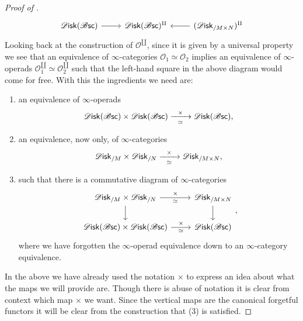 \documentclass[../text.tex]{subfiles}
\begin{document}
\begin{proof}[Proof of ]
\begin{equation}
\begin{tikzcd}
            \disk(\bsc) \arrow[r] & \disk(\bsc)^{\amalg} & (\disk_{/M \times N})^{\amalg} \arrow[l]
        \end{tikzcd}
    \end{equation}
    Looking back at the construction \cite[Con.2.4.3.1]{lurie_ha} of $\mathscr{O}^{\coprod}$, since it is given by a universal property we see that an equivalence of $\infty$-categories $\mathscr{O}_1 \simeq \mathscr{O}_2$ implies an equivalence of $\infty$-operads $\mathscr{O}_1^{\amalg} \simeq \mathscr{O}_2^{\amalg}$ such that the left-hand square in the above diagram would come for free. With this the ingredients we need are:
    \begin{enumerate}
        \item an equivalence of $\infty$-operads
        \begin{equation}
            \disk(\bsc) \times \disk(\bsc) \xrightarrow[\ \ \simeq \ \ ]{\times} \disk(\bsc),
        \end{equation}
        \item an equivalence, now only, of $\infty$-categories
        \begin{equation}
            \disk_{/M} \times \disk_{/N} \xrightarrow[\ \ \simeq \ \ ]{\times} \disk_{/M \times N},
        \end{equation}
        \item such that there is a commutative diagram of $\infty$-categories
        \begin{equation}
            \begin{tikzcd}
                \disk_{/M} \times \disk_{/N} \arrow[r, "\times", "\simeq"'] \arrow[d] & \disk_{/M \times N} \arrow[d] \\
                \disk(\bsc) \times \disk(\bsc) \arrow[r, "\times", "\simeq"'] & \disk(\bsc)
            \end{tikzcd},
        \end{equation}
        where we have forgotten the $\infty$-operad equivalence down to an $\infty$-category equivalence.
    \end{enumerate}
    In the above we have already used the notation $\times$ to express an idea about what the maps we will provide are. Though there is abuse of notation it is clear from context which map $\times$ we want. Since the vertical maps are the canonical forgetful functors it will be clear from the construction that (3) is satisfied.


\end{proof}
\end{document}
